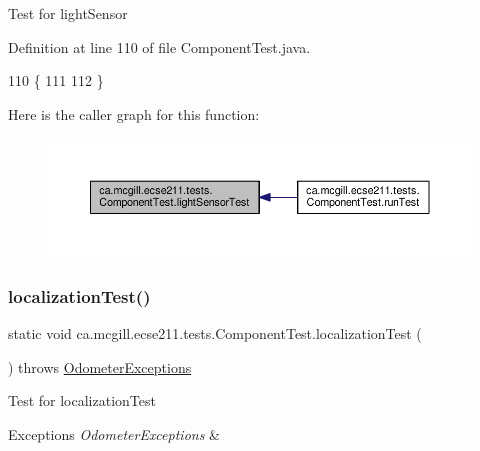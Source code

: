 Test for light\+Sensor 

Definition at line 110 of file Component\+Test.\+java.


\begin{DoxyCode}
110                                        \{
111 
112   \}
\end{DoxyCode}
Here is the caller graph for this function\+:
\nopagebreak
\begin{figure}[H]
\begin{center}
\leavevmode
\includegraphics[width=350pt]{enumca_1_1mcgill_1_1ecse211_1_1tests_1_1_component_test_a3e8288f482b3806a0f3c4668951f3e36_icgraph}
\end{center}
\end{figure}
\mbox{\label{enumca_1_1mcgill_1_1ecse211_1_1tests_1_1_component_test_ad11712dd74c5c64e84cd71186a59a087}} 
\subsubsection{\texorpdfstring{localization\+Test()}{localizationTest()}}
{\footnotesize\ttfamily static void ca.\+mcgill.\+ecse211.\+tests.\+Component\+Test.\+localization\+Test (\begin{DoxyParamCaption}{ }\end{DoxyParamCaption}) throws \hyperlink{classca_1_1mcgill_1_1ecse211_1_1odometer_1_1_odometer_exceptions}{Odometer\+Exceptions}\hspace{0.3cm}{\ttfamily [static]}}

Test for localization\+Test


\begin{DoxyExceptions}{Exceptions}
{\em Odometer\+Exceptions} & \\
\hline
\end{DoxyExceptions}


